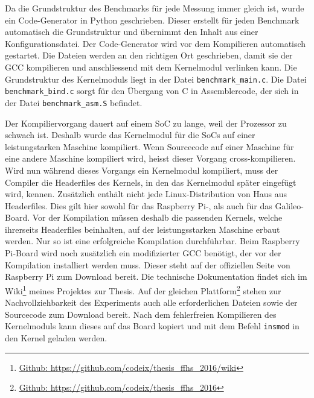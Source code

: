 Da die Grundstruktur des Benchmarks für jede Messung immer gleich ist, wurde ein Code-Generator in Python geschrieben. Dieser erstellt für jeden Benchmark automatisch die Grundstruktur und übernimmt den Inhalt aus einer Konfigurationsdatei. Der Code-Generator wird vor dem Kompilieren automatisch gestartet. Die Dateien werden an den richtigen Ort geschrieben, damit sie der GCC kompilieren und anschliessend mit dem Kernelmodul verlinken kann. Die Grundstruktur des Kernelmoduls liegt in der Datei \texttt{benchmark\_main.c}. Die Datei \texttt{benchmark\_bind.c} sorgt für den Übergang von C in Assemblercode, der sich in der Datei \texttt{benchmark\_asm.S} befindet.
\par
Der Kompiliervorgang dauert auf einem SoC zu lange, weil der Prozessor zu schwach ist. Deshalb wurde das Kernelmodul für die SoCs auf einer leistungstarken Maschine kompiliert. Wenn Sourcecode auf einer Maschine für eine andere Maschine kompiliert wird, heisst dieser Vorgang cross-kompilieren. Wird nun während dieses Vorgangs ein Kernelmodul kompiliert, muss der Compiler die Headerfiles des Kernels, in den das Kernelmodul später eingefügt wird, kennen. Zusätzlich enthält nicht jede Linux-Distribution von Haus aus Headerfiles. Dies gilt hier sowohl für das Raspberry Pi-, als auch für das Galileo-Board. Vor der Kompilation müssen deshalb die passenden Kernels, welche ihrerseits Headerfiles beinhalten, auf der leistungsstarken Maschine erbaut werden. Nur so ist eine erfolgreiche Kompilation durchführbar. Beim Raspberry Pi-Board wird noch zusätzlich ein modifizierter GCC benötigt, der vor der Kompilation installiert werden muss. Dieser steht auf der offiziellen Seite von Raspberry Pi zum Download bereit. Die technische Dokumentation findet sich im Wiki\footnote{\url{Github: https://github.com/codeix/thesis_ffhs_2016/wiki}} meines Projektes zur Thesis. Auf der gleichen Plattform\footnote{\url{Github: https://github.com/codeix/thesis_ffhs_2016}} stehen zur Nachvollziehbarkeit des Experiments auch alle erforderlichen Dateien sowie der Sourcecode zum Download bereit. Nach dem fehlerfreien Kompilieren des Kernelmoduls kann dieses auf das Board kopiert und mit dem Befehl \texttt{insmod} in den Kernel geladen werden.


